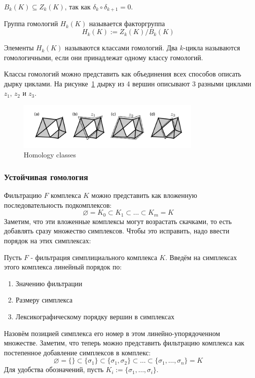 \documentclass{article}
\begin{document}
\begin{lemma}
  $B_k(K)\subseteq Z_k(K)$, так как $\delta_k \circ \delta_{k+1} = 0$.
\end{lemma}
\begin{definition}
  Группа гомологий $H_k(K)$ называется факторгруппа
  \[H_k(K) := Z_k(K)/B_k(K)\]

  Элементы $H_k(K)$ называются классами гомологий. Два $k$-цикла называются гомологичными, если они принадлежат одному классу гомологий.
\end{definition}
\begin{example}
Классы гомологий можно представить как объединения всех способов описать дырку циклами. На рисунке~\ref{fig:homology_classes} дырку из 4 вершин описывают 3 разными циклами $z_1$, $z_2$ и $z_3$.
\begin{figure}[ht]
  \centering
  \includegraphics[width=0.8\textwidth]{images/homology_classes.png}
  \caption{Homology classes}
  \label{fig:homology_classes}
\end{figure}
\end{example}
\subsubsection{Устойчивая гомология}
Фильтрацию $F$ комплекса $K$ можно представить как вложенную последовательность подкомплексов:
\[\varnothing = K_0 \subset K_1 \subset \dots \subset K_m = K\]
Заметим, что эти вложенные комплексы могут возрастать скачками, то есть добавлять сразу множество симплексов. Чтобы это исправить, надо ввести порядок на этих симплексах:
\begin{definition}
  Пусть $F$ - фильтрация симплициального комплекса $K$. Введём на симплексах этого комплекса линейный порядок по:
  \begin{enumerate}
    \item Значению фильтрации
    \item Размеру симплекса
    \item Лексикографическому порядку вершин в симплексах
  \end{enumerate}

  Назовём позицией симплекса его номер в этом линейно-упорядоченном множестве. Заметим, что теперь можно представить фильтрацию комплекса как постепенное добавление симплексов в комплекс:
  \[\varnothing = \{\} \subset \{\sigma_1\} \subset \{\sigma_1, \sigma_2\}\subset \dots\subset \{\sigma_1, \dots,\sigma_n\} = K\]
  Для удобства обозначений, пусть $K_i := \{\sigma_1, \dots, \sigma_i\}$.
\end{definition}
\end{document}
